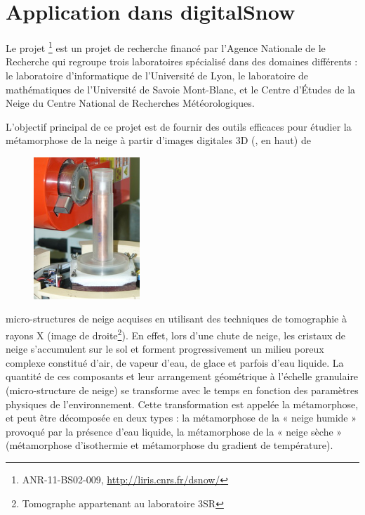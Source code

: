 %
\section{Application dans digitalSnow}%
\label{sec:applications:digitalsnow}
%
Le projet \digitalSnow\footnote{ANR-11-BS02-009, \url{http://liris.cnrs.fr/dsnow/}} est un projet de recherche financé par l'Agence Nationale de le
Recherche qui regroupe trois laboratoires spécialisé dans des domaines
différents : le laboratoire d'informatique \textsc{} de l'Université de
Lyon, le laboratoire de mathématiques \textsc{} de l'Université de Savoie
Mont-Blanc, et le Centre d'Études de la Neige \textsc{} du Centre National de
Recherches Météorologiques.


L'objectif principal de ce projet est de fournir des outils efficaces pour
étudier la métamorphose de la neige à partir d'images digitales 3D
(, en haut) de
%
\begin{figure}
	\includegraphics[width=4cm]{images/digitalSnow/YTEjpE}
\end{figure}
%
micro-structures de neige acquises en utilisant des techniques de tomographie à
rayons X (image de droite\footnote{Tomographe appartenant au laboratoire 3SR}).
En effet, lors d'une chute de neige, les cristaux de neige s'accumulent sur le
sol et forment progressivement un milieu poreux complexe constitué d'air, de
vapeur d'eau, de glace et parfois d'eau liquide. La quantité de ces composants
et leur arrangement géométrique à l'échelle granulaire (micro-structure de
neige) se transforme avec le temps en fonction des paramètres physiques de
l'environnement. Cette transformation est appelée la métamorphose, et peut être
décomposée en deux types : la métamorphose de la « neige humide » provoqué par
la présence d'eau liquide, la métamorphose de la « neige sèche » (métamorphose
d'isothermie et métamorphose du gradient de température).



